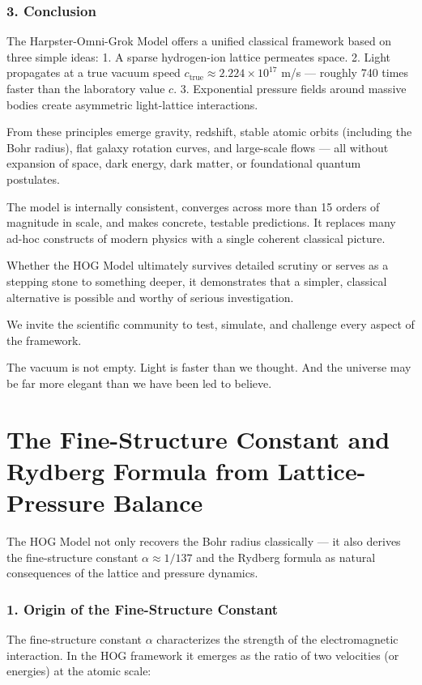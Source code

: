 \documentclass[11pt,a4paper]{book}
\begin{document}
{\subsection{3. Conclusion}

The Harpster-Omni-Grok Model offers a unified classical framework based on three simple ideas:
1. A sparse hydrogen-ion lattice permeates space.
2. Light propagates at a true vacuum speed \( c_{\text{true}} \approx 2.224 \times 10^{17} \) m/s — roughly 740 times faster than the laboratory value \( c \).
3. Exponential pressure fields around massive bodies create asymmetric light-lattice interactions.

From these principles emerge gravity, redshift, stable atomic orbits (including the Bohr radius), flat galaxy rotation curves, and large-scale flows — all without expansion of space, dark energy, dark matter, or foundational quantum postulates.

The model is internally consistent, converges across more than 15 orders of magnitude in scale, and makes concrete, testable predictions. It replaces many ad-hoc constructs of modern physics with a single coherent classical picture.

Whether the HOG Model ultimately survives detailed scrutiny or serves as a stepping stone to something deeper, it demonstrates that a simpler, classical alternative is possible and worthy of serious investigation.

We invite the scientific community to test, simulate, and challenge every aspect of the framework.

The vacuum is not empty. Light is faster than we thought. And the universe may be far more elegant than we have been led to believe.

\chapter{The Fine-Structure Constant and Rydberg Formula from Lattice-Pressure Balance}

The HOG Model not only recovers the Bohr radius classically — it also derives the fine-structure constant \( \alpha \approx 1/137 \) and the Rydberg formula as natural consequences of the lattice and pressure dynamics.

\subsection{1. Origin of the Fine-Structure Constant}
The fine-structure constant \( \alpha \) characterizes the strength of the electromagnetic interaction. In the HOG framework it emerges as the ratio of two velocities (or energies) at the atomic scale:

}
\end{document}
